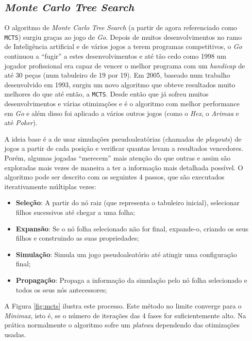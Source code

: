 \documentclass[12pt,a4paper,oneside]{article}
\begin{document}
\newpage

\subsection{\textit{Monte Carlo Tree Search}}
\label{ssec:mcts}

O algoritmo de \textit{Monte Carlo Tree Search} (a partir de agora
referenciado como \texttt{MCTS}) surgiu graças ao jogo de
\textit{Go}. Depois de muitos desenvolvimentos no ramo de Inteligência
artificial e de vários jogos a terem programas competitivos, o
\textit{Go} continuou a ``fugir'' a estes desenvolvimentos e até tão
cedo como 1998 um jogador profissional era capaz de vencer o melhor
programa com um \textit{handicap} de até 30 peças (num tabuleiro de 19
por 19).  Em 2005, baseado num trabalho desenvolvido em
1993\cite{Brugmann:1993}, surgiu um novo algoritmo que obteve
resultados muito melhores do que até então, a \texttt{MCTS}. Desde
então que já sofreu muitos desenvolvimentos e várias otimizações e é o
algoritmo com melhor performance em \textit{Go} e além disso foi
aplicado a vários outros jogos (como o \textit{Hex}, o \textit{Arimaa}
e até \textit{Poker}).

A ideia base é a de usar simulações pseudoaleatórias (chamadas de
\textit{playouts}) de jogos a partir de cada posição e verificar
quantas levam a resultados vencedores. Porém, algumas jogadas
``merecem'' mais atenção do que outras e assim são exploradas mais
vezes de maneira a ter a informação mais detalhada possível. O
algoritmo pode ser descrito com os seguintes 4 passos, que são
executados iterativamente múltiplas vezes:

\begin{itemize}
  \item \textbf{Seleção}: A partir do nó raiz (que representa o
    tabuleiro inicial), selecionar filhos sucessivos até chegar a uma
    folha;
  \item \textbf{Expansão}: Se o nó folha selecionado não for final,
    expande-o, criando os seus filhos e construindo as suas
    propriedades;
  \item \textbf{Simulação}: Simula um jogo pseudoaleatório até atingir
    uma configuração final;
  \item \textbf{Propagação}: Propaga a informação da simulação pelo nó
    folha selecionado e todos os seus nós antecessores;
\end{itemize}

A Figura \ref{fig:mcts} ilustra este processo. Este método no limite
converge para o \textit{Minimax}, isto é, se o número de iterações das
4 fases for suficientemente alto. Na prática normalmente o algoritmo
sofre um \textit{plateau} dependendo das otimizações usadas.
\end{document}
